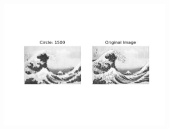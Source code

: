 \documentclass[12pt]{article}
\begin{document}
\begin{figure}[H]
\centering
\noindent\includegraphics[width=0.75\textwidth]{../results/wave/wave_1500}
\end{figure}













\newpage
\end{document}
